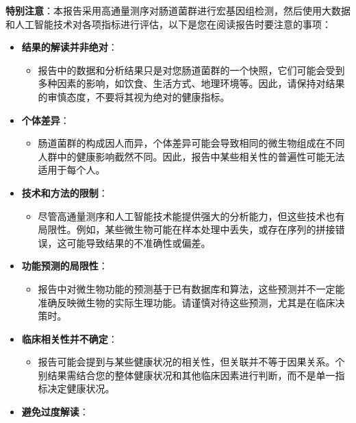 \documentclass[UTF8]{ctexart}
\begin{document}
\begin{tcolorbox}[
    enhanced,
    colback=lightpurple!10, %
    colframe=white,  %
    arc=3mm,
    boxrule=0.5pt,
    width=\textwidth,
    top=8pt,
    bottom=8pt
]
{\small{\color{orange}\faExclamationTriangle}
\textbf{特别注意}：本报告采用高通量测序对肠道菌群进行宏基因组检测，然后使用大数据和人工智能技术对各项指标进行评估，以下是您在阅读报告时要注意的事项：
\begin{itemize}

    \item \textbf{结果的解读并非绝对}：
    \begin{itemize}
        \item 报告中的数据和分析结果只是对您肠道菌群的一个快照，它们可能会受到多种因素的影响，如饮食、生活方式、地理环境等。因此，请保持对结果的审慎态度，不要将其视为绝对的健康指标。
    \end{itemize}
    \item \textbf{个体差异}：
    \begin{itemize}
        \item 肠道菌群的构成因人而异，个体差异可能会导致相同的微生物组成在不同人群中的健康影响截然不同。因此，报告中某些相关性的普遍性可能无法适用于每个人。
    \end{itemize}
    \item \textbf{技术和方法的限制}：
    \begin{itemize}
        \item 尽管高通量测序和人工智能技术能提供强大的分析能力，但这些技术也有局限性。例如，某些微生物可能在样本处理中丢失，或存在序列的拼接错误，这可能导致结果的不准确性或偏差。
    \end{itemize}
    \item \textbf{功能预测的局限性}：
    \begin{itemize}
        \item 报告中对微生物功能的预测基于已有数据库和算法，这些预测并不一定能准确反映微生物的实际生理功能。请谨慎对待这些预测，尤其是在临床决策时。
    \end{itemize}
    \item \textbf{临床相关性并不确定}：
    \begin{itemize}
        \item 报告可能会提到与某些健康状况的相关性，但关联并不等于因果关系。个别结果需结合您的整体健康状况和其他临床因素进行判断，而不是单一指标决定健康状况。
    \end{itemize}
    \item \textbf{避免过度解读}：
    \begin{itemize}

\end{itemize}
\end{itemize}}
\end{tcolorbox}
\end{document}
